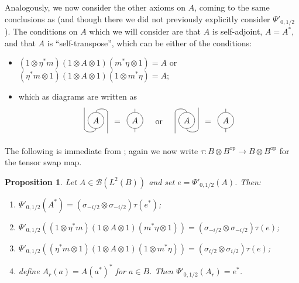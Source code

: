 \documentclass[a4paper,11pt]{article}
\newenvironment{sd}{\begin{array}{c} \begin{tikzpicture}}{\end{tikzpicture} \end{array}}
\def\hsep{1cm}
\theoremstyle{plain}
\newtheorem{proposition}{Proposition}[section]
\theoremstyle{remark}
\newcommand{\mc}[1]{\mathcal{#1}}
\newcommand{\op}{{\operatorname{op}}}
\begin{document}
Analogously, we now consider the other axioms on $A$, coming to the same conclusions as \cite{Yamashita_QG_Notes} (and \cite{daws_quantum_graphs} though there we did not previously explicitly consider $\Psi'_{0,1/2}$).  The conditions on $A$ which we will consider are that $A$ is self-adjoint, $A=A^*$, and that $A$ is ``self-transpose'', which can be either of the conditions:
\begin{itemize}
  \item $(1\otimes\eta^*m)(1\otimes A\otimes 1)(m^*\eta\otimes 1)=A$
or $(\eta^*m\otimes 1)(1\otimes A\otimes 1)(1\otimes m^*\eta)=A$;
  \item which as diagrams are written as
\[
\begin{sd}
\node[circle,draw] (G) {$A$};
\draw (G.north) to[out=90,in=90] ([xshift=\hsep/2]G.north) --++(0,-.9);
\draw (G.south) to[out=-90,in=-90] ([xshift=-\hsep/2]G.south) --++(0,.9);
\end{sd}=\begin{sd}
\node[circle,draw] (G1) {$A$};
\draw (G1)--++(0,\hsep/2);
\draw (G1)--++(0,-\hsep/2);
\end{sd}
\quad\text{or}\quad
\begin{sd}
\node[circle,draw] (G) {$A$};
\draw (G.north) to[out=90,in=90] ([xshift=-\hsep/2]G.north) --++(0,-.9);
\draw (G.south) to[out=-90,in=-90] ([xshift=\hsep/2]G.south) --++(0,.9);
\end{sd}=\begin{sd}
\node[circle,draw] (G1) {$A$};
\draw (G1)--++(0,\hsep/2);
\draw (G1)--++(0,-\hsep/2);
\end{sd}
\]
\end{itemize}

The following is immediate from \cite[Proposition~5.5, Lemma~5.7]{daws_quantum_graphs}; again we now write $\tau \colon B\otimes B^\op \to B\otimes B^\op$ for the tensor swap map.

\begin{proposition}
Let $A\in\mc B(L^2(B))$ and set $e = \Psi'_{0,1/2}(A)$.  Then:
\begin{enumerate}
  \item $\Psi'_{0,1/2}(A^*) = (\sigma_{-i/2}\otimes\sigma_{-i/2})\tau(e^*)$;
  \item $\Psi'_{0,1/2}((1\otimes\eta^*m)(1\otimes A\otimes 1)(m^*\eta\otimes 1)) = (\sigma_{-i/2}\otimes\sigma_{-i/2})\tau(e)$;
  \item $\Psi'_{0,1/2}((\eta^*m\otimes 1)(1\otimes A\otimes 1)(1\otimes m^*\eta)) = (\sigma_{i/2}\otimes\sigma_{i/2})\tau(e)$;
  \item define $A_r(a) = A(a^*)^*$ for $a\in B$.  Then $\Psi'_{0,1/2}(A_r) = e^*$.
\end{enumerate}
\end{proposition}
\end{document}
